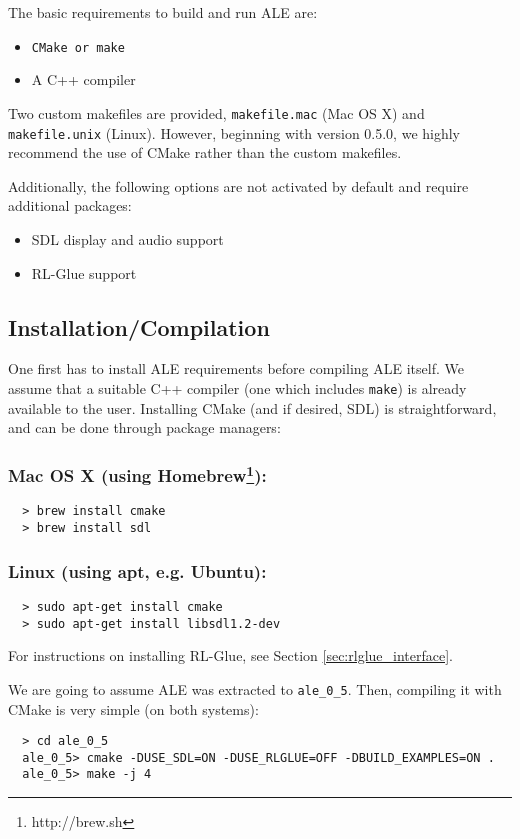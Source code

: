 \documentclass[12pt]{article}
\begin{document}
The basic requirements to build and run ALE are:

\begin{itemize}
  \item \verb+CMake or make+
  \item A C++ compiler
\end{itemize}

Two custom makefiles are provided, \verb+makefile.mac+ (Mac OS X) and \verb+makefile.unix+ (Linux). However, beginning with version 0.5.0, we highly recommend the use of CMake rather than the custom makefiles.

Additionally, the following options are not activated by default and require additional packages:
\begin{itemize}
  \item SDL display and audio support
  \item RL-Glue support
\end{itemize}

\subsection{Installation/Compilation}\label{subsec:installation_compilation}

One first has to install ALE requirements before compiling ALE itself. 
We assume that a suitable C++ compiler (one which includes \verb+make+) is already available to 
the user. Installing CMake (and if desired, SDL) is straightforward, and can be done through 
package managers: 

\subsubsection*{Mac OS X (using Homebrew\footnote{http://brew.sh}):}
\begin{verbatim}
  > brew install cmake
  > brew install sdl
\end{verbatim}

\subsubsection*{Linux (using apt, e.g. Ubuntu):}
\begin{verbatim}
  > sudo apt-get install cmake
  > sudo apt-get install libsdl1.2-dev
\end{verbatim}

For instructions on installing RL-Glue, see Section \ref{sec:rlglue_interface}.

We are going to assume ALE was extracted to \verb+ale_0_5+. Then, compiling it
with CMake is very simple (on both systems):
\begin{verbatim}
  > cd ale_0_5
  ale_0_5> cmake -DUSE_SDL=ON -DUSE_RLGLUE=OFF -DBUILD_EXAMPLES=ON .
  ale_0_5> make -j 4
\end{verbatim}
\end{document}
